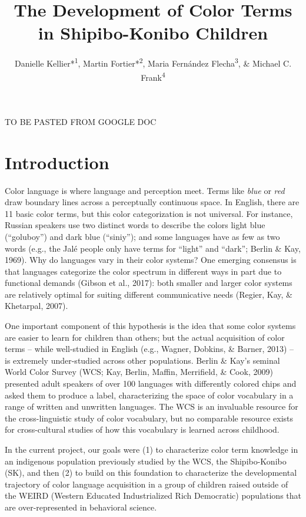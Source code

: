 \documentclass[
  english,
  ,man,floatsintext]{apa6}
\title{The Development of Color Terms in Shipibo-Konibo Children}
\author{Danielle Kellier*\textsuperscript{1}, Martin Fortier*\textsuperscript{2}, Maria Fernández Flecha\textsuperscript{3}, \& Michael C. Frank\textsuperscript{4}}
\date{}
\affiliation{\vspace{0.5cm}\textsuperscript{1} University of Pennsylvania\\\textsuperscript{2} PSL Research University\\\textsuperscript{3} Pontificia Universidad Católica del Perú\\\textsuperscript{4} Stanford University}
\begin{document}
\maketitle

TO BE PASTED FROM GOOGLE DOC

\hypertarget{introduction}{%
\section{Introduction}\label{introduction}}

Color language is where language and perception meet. Terms like \emph{blue} or \emph{red} draw boundary lines across a perceptually continuous space. In English, there are 11 basic color terms, but this color categorization is not universal. For instance, Russian speakers use two distinct words to describe the colors light blue (\enquote{goluboy}) and dark blue (\enquote{siniy}); and some languages have as few as two words (e.g., the Jalé people only have terms for ``light'' and ``dark''; Berlin \& Kay, 1969). Why do languages vary in their color systems? One emerging consensus is that languages categorize the color spectrum in different ways in part due to functional demands (Gibson et al., 2017): both smaller and larger color systems are relatively optimal for suiting different communicative needs (Regier, Kay, \& Khetarpal, 2007).

One important component of this hypothesis is the idea that some color systems are easier to learn for children than others; but the actual acquisition of color terms -- while well-studied in English (e.g., Wagner, Dobkins, \& Barner, 2013) -- is extremely under-studied across other populations. Berlin \& Kay's seminal World Color Survey (WCS; Kay, Berlin, Maffin, Merrifield, \& Cook, 2009) presented adult speakers of over 100 languages with differently colored chips and asked them to produce a label, characterizing the space of color vocabulary in a range of written and unwritten languages. The WCS is an invaluable resource for the cross-linguistic study of color vocabulary, but no comparable resource exists for cross-cultural studies of how this vocabulary is learned across childhood.

In the current project, our goals were (1) to characterize color term knowledge in an indigenous population previously studied by the WCS, the Shipibo-Konibo (SK), and then (2) to build on this foundation to characterize the developmental trajectory of color language acquisition in a group of children raised outside of the WEIRD (Western Educated Industrialized Rich Democratic) populations that are over-represented in behavioral science.
\end{document}
